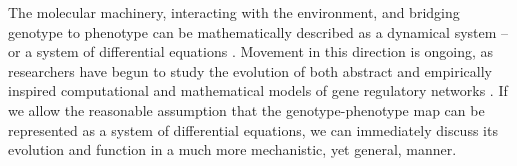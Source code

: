 \documentclass{article}
\newcommand{\1}{\mathbbm{1}}
\begin{document}
%
%

The molecular machinery, interacting with the environment, and bridging genotype to phenotype
can be mathematically described as a dynamical system -- or a system of differential equations \citep{jaeger2015comet}.
 Movement in this direction is ongoing, as researchers have begun to study 
the evolution of both abstract \citep{wagner1994evolution, wagner1996does,  siegal2002waddington, bergman2003evolutionary, draghi2015robustness} and empirically inspired computational and mathematical models of gene regulatory networks \citep{mjolsness1991connectionist, jaeger2004dynamic, maria1, vitaly1, vitaly2, crombach2016gap, wotton2015quantitative, chertkova2017insilico}. If we allow the reasonable assumption that the genotype-phenotype map can be represented as a system of differential equations, we can immediately discuss its evolution and function in a much more mechanistic, yet general, manner. 
\end{document}
